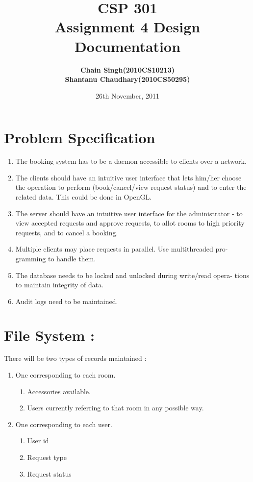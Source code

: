 \documentclass{article}
\title{CSP 301\\ Assignment 4 Design Documentation}
\author{\bf Chain Singh(2010CS10213)\\\bf Shantanu Chaudhary(2010CS50295)}
\date{26th November, 2011}
\begin{document}
\maketitle
\section*{Problem Specification}
\begin{enumerate}
\item The booking system has to be a daemon accessible to clients over a network.
\item The clients should have an intuitive user interface that lets him/her choose
the operation to perform (book/cancel/view request status) and to enter
the related data. This could be done in OpenGL.
\item The server should have an intuitive user interface for the administrator
- to view accepted requests and approve requests, to allot rooms to high
priority requests, and to cancel a booking.
\item Multiple clients may place requests in parallel. Use multithreaded pro-
gramming to handle them.
\item The database needs to be locked and unlocked during write/read opera-
tions to maintain integrity of data.
\item Audit logs need to be maintained.
\end{enumerate}
\section*{File System :}
There will be two types of records maintained :
\begin{enumerate}
\item One corresponding to each room.
	\begin{enumerate}
	\item Accessories available.
	\item Users currently referring to that room in any possible way.
	\end{enumerate}
\item One corresponding to each user.
	\begin{enumerate}
	\item User id  
	\item Request type
	\item Request status
	\end{enumerate}
\end{enumerate}
\end{document}
